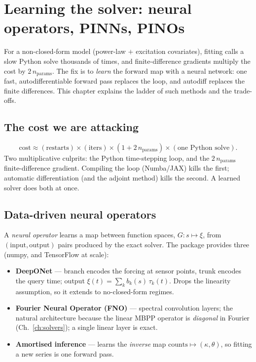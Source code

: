 \chapter{Learning the solver: neural operators, PINNs, PINOs}
\label{ch:neural}

\begin{motivation}
For a non-closed-form model (power-law $+$ excitation covariates), fitting calls a
slow Python solve thousands of times, and finite-difference gradients multiply the
cost by $2\,n_{\text{params}}$. The fix is to \emph{learn} the forward map with a
neural network: one fast, autodifferentiable forward pass replaces the loop, and
autodiff replaces the finite differences. This chapter explains the ladder of such
methods and the trade-offs.
\end{motivation}

\section{The cost we are attacking}

\begin{equation*}
\text{cost}\approx(\text{restarts})\times(\text{iters})\times(1+2\,n_{\text{params}})\times(\text{one Python solve}).
\end{equation*}
Two multiplicative culprits: the Python time-stepping loop, and the
$2\,n_{\text{params}}$ finite-difference gradient. Compiling the loop (Numba/JAX)
kills the first; automatic differentiation (and the adjoint method) kills the
second. A learned solver does both at once.

\section{Data-driven neural operators}

A \emph{neural operator} learns a map between function spaces, $G:s\mapsto\xi$,
from $(\text{input},\text{output})$ pairs produced by the exact solver. The package
provides three (numpy, and TensorFlow at scale):

\begin{itemize}[leftmargin=1.4em]
\item \textbf{DeepONet} --- branch encodes the forcing at sensor points, trunk
encodes the query time; output $\xi(t)=\sum_k b_k(s)\,\tau_k(t)$. Drops the
linearity assumption, so it extends to no-closed-form regimes.
\item \textbf{Fourier Neural Operator (FNO)} --- spectral convolution layers; the
natural architecture because the linear MBPP operator is \emph{diagonal} in Fourier
(Ch.~\ref{ch:solvers}); a single linear layer is exact.
\item \textbf{Amortised inference} --- learns the \emph{inverse} map
$\text{counts}\mapsto(\kappa,\theta)$, so fitting a new series is one forward pass.
\end{itemize}


